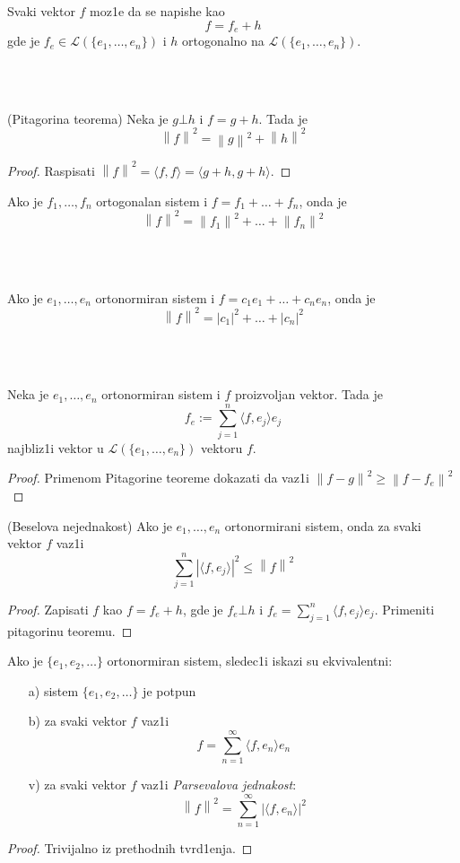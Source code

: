 \documentclass[a4paper,12pt]{article}
\newcommand{\norm}[1]{\left\lVert#1\right\rVert}
\begin{document}
\begin{posl}
Svaki vektor $f$ moz1e da se napishe kao 
\[f = f_e + h\]
gde je $f_e \in \mathcal{L}(\{e_1, \dots, e_n \})$ i $h$ ortogonalno na $\mathcal{L}(\{e_1, \dots, e_n \})$.
\end{posl}
\\ \\
\begin{lema}
(Pitagorina teorema) Neka je $g\bot h$ i $f = g+h$. Tada je \[\norm{f}^2 = \norm{g}^2 + \norm{h}^2\]
\end{lema}
\begin{proof}
Raspisati $\norm{f}^2 = \langle f, f \rangle = \langle g+h, g+h \rangle $.
\end{proof}

\begin{posl}
Ako je $f_1, \dots, f_n$ ortogonalan sistem i $f = f_1 + \dots + f_n$, onda je 
\[\norm{f}^2 = \norm{f_1}^2 + \dots + \norm{f_n}^2 \]
\end{posl}
\\ \\
\begin{posl}
Ako je $e_1, \dots , e_n$ ortonormiran sistem i $f = c_1 e_1 + \dots + c_n e_n$, onda je 
\[\norm{f}^2 = {|c_1|}^2 + \dots + {|c_n|}^2\]
\end{posl}
\\ \\
\begin{tvr}
Neka je $e_1, \dots , e_n$ ortonormiran sistem i $f$ proizvoljan vektor. Tada je \[f_e := \sum_{j=1}^n \langle f, e_j \rangle e_j\] najbliz1i vektor u $\mathcal{L}(\{e_1, \dots, e_n \})$ vektoru $f$.
\end{tvr}
\begin{proof}
Primenom Pitagorine teoreme dokazati da vaz1i $\norm{f-g}^2 \geq \norm{f - f_e}^2$
\end{proof}

\begin{tvr}
(Beselova nejednakost) Ako je $e_1, \dots, e_n$ ortonormirani sistem, onda za svaki vektor $f$ vaz1i
\[\sum_{j=1}^n {| \langle f, e_j \rangle |}^2 \leq \norm{f}^2 \]
\end{tvr}
\begin{proof}
Zapisati $f$ kao $f = f_e + h$, gde je $f_e\bot h$ i $f_e = \sum_{j=1}^n \langle f, e_j \rangle e_j$. Primeniti pitagorinu teoremu.
\end{proof}

\begin{tma}
Ako je $\{e_1, e_2, \dots \}$ ortonormiran sistem, sledec1i iskazi su ekvivalentni:
\begin{itemize}
\item[a)] sistem $\{e_1, e_2, \dots \}$ je potpun
\item[b)] za svaki vektor $f$ vaz1i
\[f = \sum_{n=1}^{\infty} \langle f, e_n \rangle e_n\]
\item[v)] za svaki vektor $f$ vaz1i \textit{Parsevalova jednakost}:
\[\norm{f}^2 = \sum_{n=1}^{\infty} {|\langle f, e_n \rangle |}^2 \]
\end{itemize}
\end{tma}
\begin{proof}
Trivijalno iz prethodnih tvrd1enja.
\end{proof}
\end{document}
